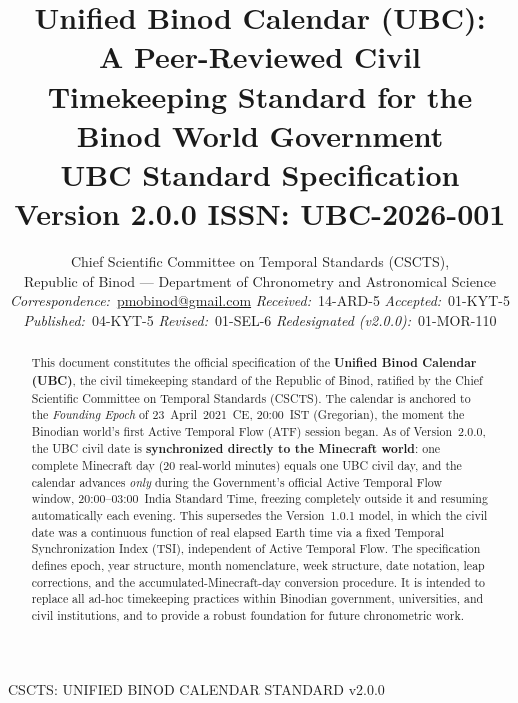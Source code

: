 \documentclass[journal,twoside]{IEEEtran}
\begin{document}
\title{Unified Binod Calendar (UBC):\\
A Peer-Reviewed Civil Timekeeping Standard for the\\
Binod World Government\\[4pt]
{\normalsize UBC Standard Specification Version 2.0.0 \quad ISSN: UBC-2026-001}}

\author{%
  Chief Scientific Committee on Temporal Standards (CSCTS),\\
  Republic of Binod --- Department of Chronometry and Astronomical Science\\[2pt]
  \textit{Correspondence:}~\href{mailto:pmobinod@gmail.com}{pmobinod@gmail.com}  \quad
  \textit{Received:}~14-ARD-5 \quad
  \textit{Accepted:}~01-KYT-5 \quad
  \textit{Published:}~04-KYT-5 \quad
  \textit{Revised:}~01-SEL-6 \quad
  \textit{Redesignated (v2.0.0):}~01-MOR-110
}

%
{CSCTS: UNIFIED BINOD CALENDAR STANDARD v2.0.0}

\maketitle

\begin{abstract}
This document constitutes the official specification of the \textbf{Unified Binod Calendar (UBC)},
the civil timekeeping standard of the Republic of Binod, ratified by the Chief Scientific
Committee on Temporal Standards (CSCTS).  The calendar is anchored to the \textit{Founding
Epoch} of 23~April~2021~CE, 20:00~IST (Gregorian), the moment the Binodian world's first
Active Temporal Flow (ATF) session began.  As of Version~2.0.0, the UBC civil date is
\textbf{synchronized directly to the Minecraft world}: one complete Minecraft day (20
real-world minutes) equals one UBC civil day, and the calendar advances \emph{only} during
the Government's official Active Temporal Flow window, 20:00--03:00~India Standard Time,
freezing completely outside it and resuming automatically each evening. This supersedes the
Version~1.0.1 model, in which the civil date was a continuous function of real elapsed Earth
time via a fixed Temporal Synchronization Index (TSI), independent of Active Temporal Flow.
The specification defines epoch, year structure, month nomenclature, week structure,
date notation, leap corrections, and the accumulated-Minecraft-day conversion procedure.
It is intended to replace all ad-hoc timekeeping practices within Binodian government,
universities, and civil institutions, and to provide a robust foundation for future
chronometric work.
\end{abstract}
\end{document}
